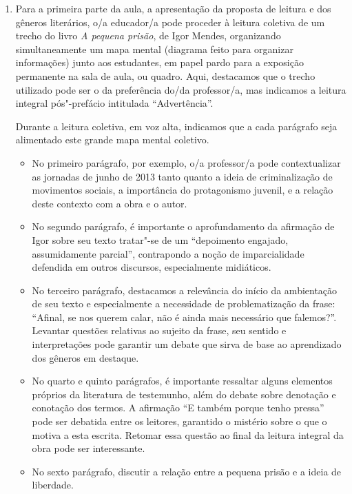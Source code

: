 \documentclass[11pt]{extarticle}
\begin{document}
\begin{enumerate}
\item Para a primeira parte da aula, a apresentação da proposta de leitura e
dos gêneros literários, o/a educador/a pode proceder à leitura coletiva
de um trecho do livro \emph{A pequena prisão}, de Igor Mendes,
organizando simultaneamente um mapa mental (diagrama feito para
organizar informações) junto aos estudantes, em papel pardo para a
exposição permanente na sala de aula, ou quadro. Aqui, destacamos que o
trecho utilizado pode ser o da preferência do/da professor/a, mas
indicamos a leitura integral pós"-prefácio intitulada ``Advertência''.

Durante a leitura coletiva, em voz alta, indicamos que a cada parágrafo
seja alimentado este grande mapa mental coletivo. 

\begin{itemize}
\item No primeiro parágrafo,
por exemplo, o/a professor/a pode contextualizar as jornadas de junho de
2013 tanto quanto a ideia de criminalização de movimentos sociais, a
importância do protagonismo juvenil, e a relação deste contexto com a
obra e o autor. 

\item No segundo parágrafo, é importante o aprofundamento da
afirmação de Igor sobre seu texto tratar"-se de um ``depoimento engajado,
assumidamente parcial'', contrapondo a noção de imparcialidade defendida
em outros discursos, especialmente midiáticos. 

\item No terceiro parágrafo,
destacamos a relevância do início da ambientação de seu texto e
especialmente a necessidade de problematização da frase: ``Afinal, se
nos querem calar, não é ainda mais necessário que falemos?''. Levantar
questões relativas ao sujeito da frase, seu sentido e interpretações
pode garantir um debate que sirva de base ao aprendizado dos gêneros em
destaque. 

\item No quarto e quinto parágrafos, é importante ressaltar alguns elementos
próprios da literatura de testemunho, além do debate sobre denotação e
conotação dos termos. A afirmação ``E também porque tenho pressa'' pode
ser debatida entre os leitores, garantido o mistério sobre o que o
motiva a esta escrita. Retomar essa questão ao final da leitura integral
da obra pode ser interessante. 

\item No sexto parágrafo, discutir a relação
entre a pequena prisão e a ideia de liberdade. 


\end{itemize}
\end{enumerate}
\end{document}
